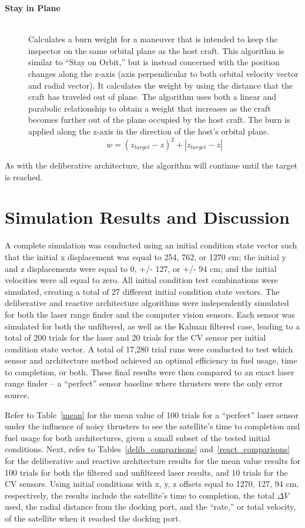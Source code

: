\documentclass[journal, 10pt]{IEEEtran}
\begin{document}
\begin{description}
\item[\textbf{Stay in Plane}] \hfill \\
Calculates a burn weight for a maneuver that is intended to keep the inspector on the same orbital plane as the host craft.  This algorithm is similar to ``Stay on Orbit,'' but is instead concerned with the position changes along the z-axis (axis perpendicular to both orbital velocity vector and radial vector).  It calculates the weight by using the distance that the craft has traveled out of plane.  The algorithm uses both a linear and parabolic relationship to obtain a weight that increases as the craft becomes further out of the plane occupied by the host craft.  The burn is applied along the z-axis in the direction of the host's orbital plane.
\begin{equation}
w = (z_{target}-z)^2+|z_{target}-z|
\end{equation}
\end{description}

As with the deliberative architecture, the algorithm will continue until the target is reached.

\section{Simulation Results and Discussion} \label{discuss}
A complete simulation was conducted using an initial condition state vector such that the initial x displacement was equal to 254, 762, or 1270 cm; the initial y and z displacements were equal to 0, +/- 127, or +/- 94 cm; and the initial velocities were all equal to zero. All initial condition test combinations were simulated, creating a total of 27 different initial condition state vectors. The deliberative and reactive architecture algorithms were independently simulated for both the laser range finder and the computer vision sensors. Each sensor was simulated for both the unfiltered, as well as the Kalman filtered case, leading to a total of 200 trials for the laser and 20 trials for the CV sensor per initial condition state vector. A total of 17,280 trial runs were conducted to test which sensor and architecture method achieved an optimal efficiency in fuel usage, time to completion, or both. These final results were then compared to an exact laser range finder -- a ``perfect'' sensor baseline where thrusters were the only error source.

Refer to Table~\ref{mean} for the mean value of 100 trials for a ``perfect'' laser sensor under the influence of noisy thrusters to see the satellite's time to completion and fuel usage for both architectures, given a small subset of the tested initial conditions. Next, refer to Tables~\ref{delib_comparisons} and~\ref{react_comparisons} for the deliberative and reactive architecture results for the mean value results for 100 trials for both the filtered and unfiltered laser results, and 10 trials for the CV sensors. Using initial conditions with x, y, z offsets equal to 1270, 127, 94 cm, respectively, the results include the satellite's time to completion, the total $\Delta V$ used, the radial distance from the docking port, and the ``rate,'' or total velocity, of the satellite when it reached the docking port.
\end{document}
